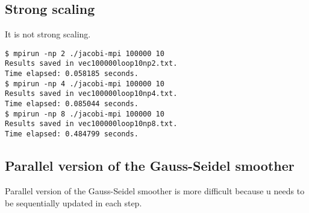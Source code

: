 \documentclass[11pt]{article} %
\begin{document}
\subsection{Strong scaling}
It is not strong scaling.

\begin{lstlisting}
$ mpirun -np 2 ./jacobi-mpi 100000 10
Results saved in vec100000loop10np2.txt.
Time elapsed: 0.058185 seconds.
$ mpirun -np 4 ./jacobi-mpi 100000 10
Results saved in vec100000loop10np4.txt.
Time elapsed: 0.085044 seconds.
$ mpirun -np 8 ./jacobi-mpi 100000 10
Results saved in vec100000loop10np8.txt.
Time elapsed: 0.484799 seconds.
\end{lstlisting}

\subsection{Parallel version of the Gauss-Seidel smoother}
Parallel version of the Gauss-Seidel smoother is more difficult because u needs to be sequentially updated in each step.
\end{document}
